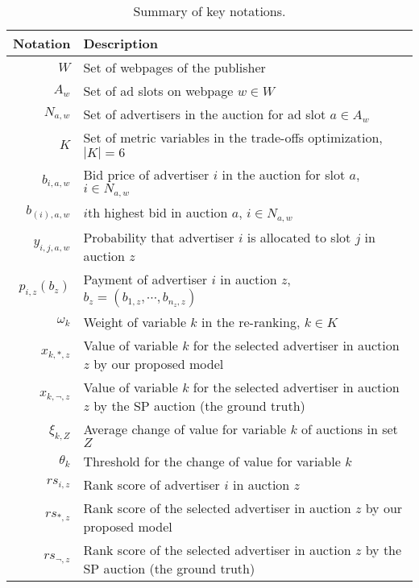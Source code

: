 \begin{table}[t]
\small
\centering
\caption{Summary of key notations.}
\label{tab:notations}
\vspace{-7pt}
\begin{tabular}{r|p{2.75in}}
\hspace{-20pt} Notation \hspace{-5pt} & Description\\
\hline
$W$ & Set of webpages of the publisher\\
$A_w$  & Set of ad slots on webpage $w \in W$\\
$N_{a,w}$   & Set of advertisers in the auction for ad slot $a \in A_w$\\
$K$     & Set of metric variables in the trade-offs optimization, $|K| = 6$\\
$b_{i,a,w}$ & Bid price of advertiser $i$ in the auction for slot $a$, $i \in N_{a,w}$\\
$b_{(i),a,w}$ & $i$th highest bid in auction $a$, $i \in N_{a,w}$\\
$y_{i,j,a,w}$ & Probability that advertiser $i$ is allocated to slot $j$ in auction $z$\\
$p_{i,z}(b_z)$ & Payment of advertiser $i$ in auction $z$, $b_z=(b_{1,z}, \cdots, b_{n_z,z})$\\
$\omega_k$ & Weight of variable $k$ in the re-ranking, $k \in K$\\
$x_{k,*,z}$ & Value of variable $k$ for the selected advertiser in auction $z$ by our proposed model\\
$x_{k,\neg,z}$ & Value of variable $k$ for the selected advertiser in auction $z$ by the SP auction (the ground truth)\\
$\xi_{k,Z}$ & Average change of value for variable $k$ of auctions in set $Z$\\
$\theta_k$ & Threshold for the change of value for variable $k$\\
$rs_{i,z}$ & Rank score of advertiser $i$ in auction $z$\\
$rs_{*,z}$ & Rank score of the selected advertiser in auction $z$ by our proposed model\\
$rs_{\neg,z}$ & Rank score of the selected advertiser in auction $z$ by the SP auction (the ground truth)\\
\end{tabular}
\end{table}



